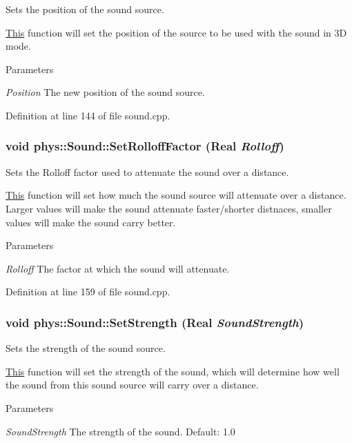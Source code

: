 Sets the position of the sound source. 

\hyperlink{structThis}{This} function will set the position of the source to be used with the sound in 3D mode. 
\begin{DoxyParams}{Parameters}
\item[{\em Position}]The new position of the sound source. \end{DoxyParams}


Definition at line 144 of file sound.cpp.

\hypertarget{classphys_1_1Sound_a56e657013dc4d561dbc3b0c5d12d542d}{
\subsubsection[{SetRolloffFactor}]{\setlength{\rightskip}{0pt plus 5cm}void phys::Sound::SetRolloffFactor ({\bf Real} {\em Rolloff})}}
\label{dc/d2f/classphys_1_1Sound_a56e657013dc4d561dbc3b0c5d12d542d}


Sets the Rolloff factor used to attenuate the sound over a distance. 

\hyperlink{structThis}{This} function will set how much the sound source will attenuate over a distance. Larger values will make the sound attenuate faster/shorter distnaces, smaller values will make the sound carry better. 
\begin{DoxyParams}{Parameters}
\item[{\em Rolloff}]The factor at which the sound will attenuate. \end{DoxyParams}


Definition at line 159 of file sound.cpp.

\hypertarget{classphys_1_1Sound_a44d6c066fad6f09553e47892a14bf5ef}{
\subsubsection[{SetStrength}]{\setlength{\rightskip}{0pt plus 5cm}void phys::Sound::SetStrength ({\bf Real} {\em SoundStrength})}}
\label{dc/d2f/classphys_1_1Sound_a44d6c066fad6f09553e47892a14bf5ef}


Sets the strength of the sound source. 

\hyperlink{structThis}{This} function will set the strength of the sound, which will determine how well the sound from this sound source will carry over a distance. 
\begin{DoxyParams}{Parameters}
\item[{\em SoundStrength}]The strength of the sound. Default: 1.0 \end{DoxyParams}


